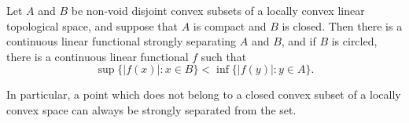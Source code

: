 Let $A$ and $B$ be non-void disjoint convex subsets of a locally convex linear topological space, and suppose that $A$ is compact and $B$ is closed. Then there is a continuous linear functional strongly separating $A$ and $B$, and if $B$ is circled, there is a continuous linear functional $f$ such that
$$\sup \{|f(x)|: x \in B\} < \inf \{|f(y)|: y \in A\}.$$

In particular, a point which does not belong to a closed convex subset of a locally convex space can always be strongly separated from the set.

